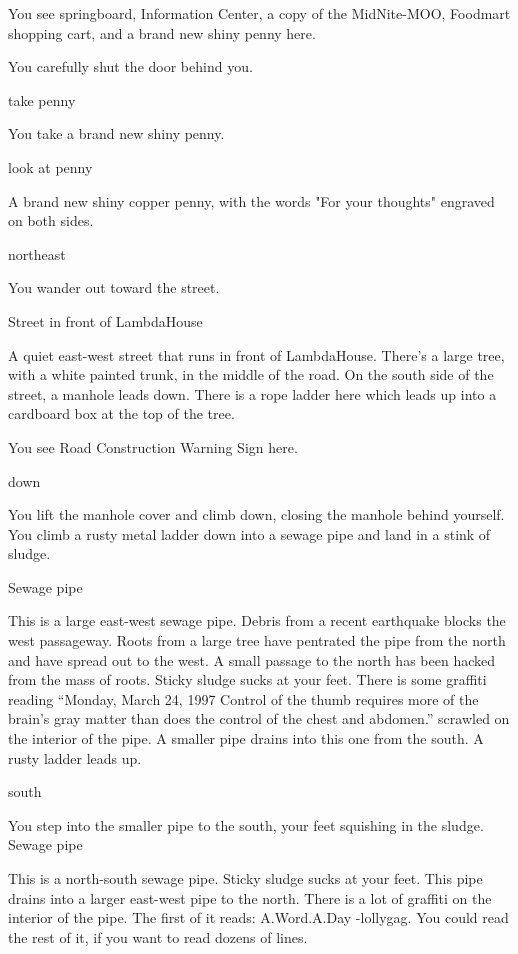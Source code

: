 \documentclass[10pt,twoside,openleft]{memoir}
\begin{document}
{You see springboard, Information Center, a copy of the MidNite-MOO, Foodmart shopping cart, and a brand new shiny penny here.

You carefully shut the door behind you.

take penny

You take a brand new shiny penny.

look at penny

A brand new shiny copper penny, with the words "For your thoughts" engraved on
 both sides.

northeast

You wander out toward the street.

Street in front of LambdaHouse

A quiet east-west street that runs in front of LambdaHouse. There's a large
 tree, with a white painted trunk, in the middle of the road.  On the south
 side of the street, a manhole leads down. There is a rope ladder here which
 leads up into a cardboard box at the top of the tree.

You see Road Construction Warning Sign here.

down

You lift the manhole cover and climb down, closing the manhole behind
 yourself.  You climb a rusty metal ladder down into a sewage pipe and land in
 a stink of sludge.

Sewage pipe

This is a large east-west sewage pipe.  Debris from a recent earthquake blocks
 the west passageway.  Roots from a large tree have pentrated the pipe from
 the north and have spread out to the west.  A small passage to the north has
 been hacked from the mass of roots.  Sticky sludge sucks at your feet.  There
 is some graffiti reading ``Monday, March 24, 1997  Control of the thumb
 requires more of the brain's gray matter than does the control of the chest
 and abdomen.'' scrawled on the interior of the pipe.  A smaller pipe drains
 into this one from the south.  A rusty ladder leads up.

south

You step into the smaller pipe to the south, your feet squishing in the sludge.
Sewage pipe

This is a north-south sewage pipe.  Sticky sludge sucks at your feet.  This
 pipe drains into a larger east-west pipe to the north.  There is a lot of
 graffiti on the interior of the pipe.  The first of it reads: A.Word.A.Day
 -lollygag.  You could read the rest of it, if you want to read dozens of
 lines.

}
\end{document}
